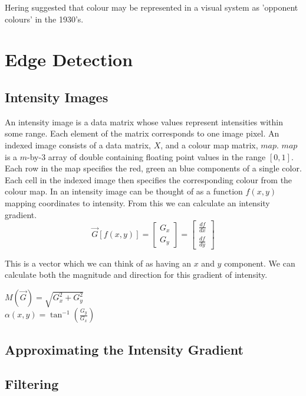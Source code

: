 \documentclass{article}
\begin{document}
	\par 
	Hering suggested that colour may be represented in a visual system as 'opponent colours' in the 1930's.
	
	
	\section{Edge Detection}
	\subsection{Intensity Images}
	An intensity image is a data matrix whose values represent intensities within some range. Each element of the matrix corresponds to one image pixel. An indexed image consists of a data matrix, $X$, and a colour map matrix, $map$. $map$ is a $m$-by-3 array of double containing floating point values in the range $[0, 1]$. Each row in the map specifies the red, green an blue components of a single color. Each cell in the indexed image then specifies the corresponding colour from the colour map. In an intensity image can be thought of as a function $f(x, y)$ mapping coordinates to intensity. From this we can calculate an intensity gradient.
	\begingroup
	\renewcommand*{\arraystretch}{1.5}
	\[ \overrightarrow{G}[f(x,y)] = \begin{bmatrix}G_{x} \\ G_{y} \end{bmatrix} = \begin{bmatrix} \frac{df}{dx} \\ \frac{df}{dy} \end{bmatrix} \]	
	\endgroup

	 This is a vector which we can think of as having an $x$ and $y$ component. We can calculate both the magnitude and direction for this gradient of intensity. 
	\begin{multicols}{2}
		\noindent
		\centering
			$M(\overrightarrow{G}) = \sqrt{G_{x}^{2} + G_{y}^{2}}$ \\
			$\alpha(x, y) = \tan^{-1}\left(\frac{G_y}{G_x}\right)$
	\end{multicols}
	
	\subsection{Approximating the Intensity Gradient}
	
	\subsection{Filtering}
	
\end{document}
